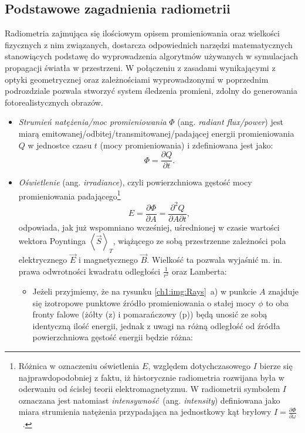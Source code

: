 \subsection{Podstawowe zagadnienia radiometrii}
Radiometria zajmująca się ilościowym opisem promieniowania oraz wielkości fizycznych z nim związanych, dostarcza odpowiednich narzędzi matematycznych stanowiących podstawę do wyprowadzenia algorytmów używanych w symulacjach propagacji światła w przestrzeni. W połączeniu z zasadami wynikającymi z optyki geometrycznej oraz zależnościami wyprowadzonymi w poprzednim podrozdziale pozwala stworzyć system śledzenia promieni, zdolny do generowania fotorealistycznych obrazów. 

\begin{itemize}
\item \textit{Strumień natężenia/moc promieniowania} $\Phi$ (ang. \textit{radiant flux/power}) jest miarą emitowanej/odbitej/transmitowanej/padającej energii promieniowania $Q$ w  jednostce czasu $t$ (mocy promieniowania) i zdefiniowana jest jako:
\begin{equation}
\Phi = \frac{\partial Q}{\partial t}.
\end{equation}
\item \textit{Oświetlenie} (ang. \textit{irradiance}), czyli powierzchniowa gęstość mocy promieniowania padającego\footnote{Różnica w oznaczeniu oświetlenia $E$, względem dotychczasowego $I$ bierze się najprawdopodobniej z faktu, iż historycznie radiometria rozwijana była w oderwaniu od ścisłej teorii elektromagnetyzmu. W radiometrii symbolem $I$ oznaczana jest natomiast \textit{intensywność}~(ang. \textit{intensity}) definiowana jako miara strumienia natężenia przypadająca na jednostkowy kąt bryłowy $I = \frac{\partial\Phi}{\partial\omega}$~\cite{PBRT}.}
\begin{equation}
E = \frac{\partial\Phi}{\partial A} = \frac{\partial^2 Q}{\partial A \partial t},
\end{equation}
odpowiada, jak już wspomniano wcześniej, uśrednionej w czasie wartości wektora Poyntinga $\left\langle \vec{S} \right\rangle_T$, wiążącego ze sobą przestrzenne zależności pola elektrycznego $\vec{E}$ i magnetycznego $\vec{B}$. Wielkość ta pozwala wyjaśnić m. in. prawa odwrotności kwadratu odległości $\frac{1}{r^2}$ oraz Lamberta:
\begin{itemize}
\item Jeżeli przyjmiemy, że na rysunku \ref{ch1:img:Rays}~a) w punkcie $A$ znajduje się izotropowe punktowe źródło promieniowania o stałej mocy $\phi$ to oba fronty falowe (żółty (z) i pomarańczowy (p)) będą unosić ze sobą identyczną ilość energii, jednak z uwagi na różną odległość od źródła powierzchniowa gęstość energii będzie różna:

\end{itemize}
\end{itemize}
